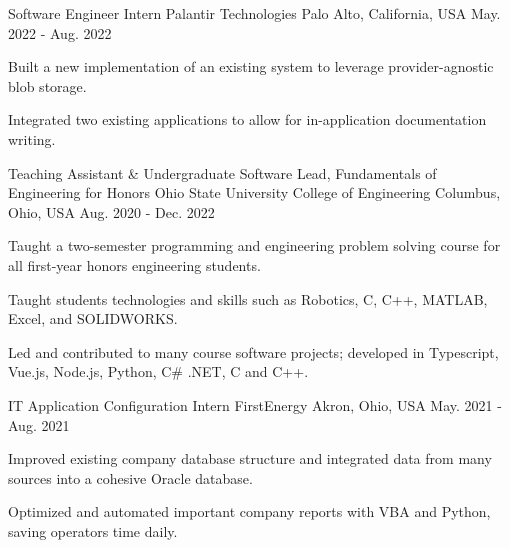 

\begin{cventries}

  \cventry
    {Software Engineer Intern} %
    {Palantir Technologies} %
    {Palo Alto, California, USA} %
    {May. 2022 - Aug. 2022} %
    {
      \begin{cvitems} %
        \item {Built a new implementation of an existing system to leverage provider-agnostic blob storage.}
        \item {Integrated two existing applications to allow for in-application documentation writing.}
       \end{cvitems}
    }

  \cventry
    {Teaching Assistant \& Undergraduate Software Lead, Fundamentals of Engineering for Honors} %
    {Ohio State University College of Engineering} %
    {Columbus, Ohio, USA} %
    {Aug. 2020 - Dec. 2022} %
    {
      \begin{cvitems} %
        \item {Taught a two-semester programming and engineering problem solving course for all first-year honors engineering students.}
        \item {Taught students technologies and skills such as Robotics, C, C++, MATLAB, Excel, and SOLIDWORKS.}
        \item {Led and contributed to many course software projects; developed in Typescript, Vue.js, Node.js, Python, C\# .NET, C and C++.}
      \end{cvitems}
    }
    
  \cventry
    {IT Application Configuration Intern} %
    {FirstEnergy} %
    {Akron, Ohio, USA} %
    {May. 2021 - Aug. 2021} %
    {
      \begin{cvitems} %
        \item {Improved existing company database structure and integrated data from many sources into a cohesive Oracle database.}
        \item {Optimized and automated important company reports with VBA and Python, saving operators time daily.}
      \end{cvitems}
    }
    

\end{cventries}
